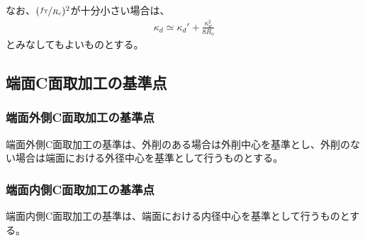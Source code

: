 なお、$(\nicefrac{f_\mathrm T}{R_\mathrm c})^2$が十分小さい場合は、
\begin{align*}
  \kappa_d \simeq \kappa_d'+\frac{\kappa_w^2}{8R_\mathrm o}
\end{align*}
とみなしてもよいものとする。



\clearpage


\subsection{端面C面取加工の基準点}

\subsubsection{端面外側C面取加工の基準点}
端面外側C面取加工の基準は、外削のある場合は外削中心を基準とし、外削のない場合は端面における外径中心を基準として行うものとする。

\subsubsection{端面内側C面取加工の基準点}
端面内側C面取加工の基準は、端面における内径中心を基準として行うものとする。


